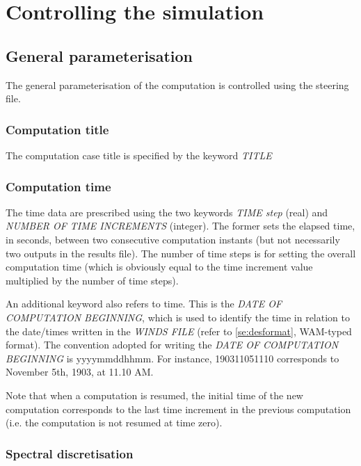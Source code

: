 \chapter{ Controlling the simulation }


\section{ General parameterisation }

 The general parameterisation of the computation is controlled using the steering file.


\subsection{ Computation title}

The computation case title is specified by the keyword \textit{TITLE}


\subsection{ Computation time}

The time data are prescribed using the two keywords \textit{TIME step} (real) and \textit{NUMBER OF TIME INCREMENTS }(integer). The
former sets the elapsed time, in seconds, between two consecutive computation instants (but not necessarily two outputs in the results
file). The number of time steps is for setting the overall computation time (which is obviously equal to the time increment value
multiplied by the number of time steps).

An additional keyword also refers to time. This is the \textit{DATE OF COMPUTATION BEGINNING}, which is used to identify the time in
relation to the date/times written in the \textit{WINDS FILE} (refer to \ref{se:desformat}, WAM-typed format). The convention adopted
for writing the \textit{DATE OF COMPUTATION BEGINNING} is yyyymmddhhmm. For instance, 190311051110 corresponds to November 5th, 1903, at
11.10 AM.

Note that when a computation is resumed, the initial time of the new computation corresponds to the last time increment in the previous
computation (i.e. the computation is not resumed at time zero).


\subsection{ Spectral discretisation}

